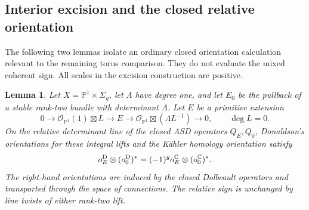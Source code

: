 \documentclass[11pt]{amsart}
\newtheorem{lemma}[theorem]{Lemma}
\theoremstyle{definition}
\theoremstyle{remark}
\theoremstyle{plain}
\newcommand{\CC}{\mathbb{C}}
\newcommand{\PP}{\mathbb{P}}
\newcommand{\cO}{\mathcal{O}}
\begin{document}
\subsection{Interior excision and the closed relative orientation}
\label{sec:closed-relative-orientation}

The following two lemmas isolate an ordinary closed
orientation calculation relevant to the remaining torus
comparison. They do not evaluate the mixed coherent sign.
All scales in the excision construction are positive.

\begin{lemma}\label{lem:closed-primitive-orientation}
Let $X=\PP^1\times\Sigma_g$, let $\Lambda$ have degree one,
and let $E_0$ be the pullback of a stable rank-two bundle
with determinant $\Lambda$. Let $E$ be a primitive extension
\[
 0\longrightarrow\cO_{\PP^1}(1)\boxtimes L
 \longrightarrow E
 \longrightarrow\cO_{\PP^1}\boxtimes(\Lambda L^{-1})
 \longrightarrow0,\qquad \deg L=0.
\]
On the relative determinant line of the closed ASD
operators $Q_E,Q_0$, Donaldson's orientations for these
integral lifts and the K\"ahler homology orientation satisfy
\begin{equation}\label{eq:closed-primitive-orientation}
 o_E^{\rm D}\otimes(o_0^{\rm D})^*
       =(-1)^g o_E^{\CC}\otimes(o_0^{\CC})^*.
\end{equation}
The right-hand orientations are induced by the closed
Dolbeault operators and transported through the space of
connections. The relative sign is unchanged by line
twists of either rank-two lift.
\end{lemma}
\end{document}
